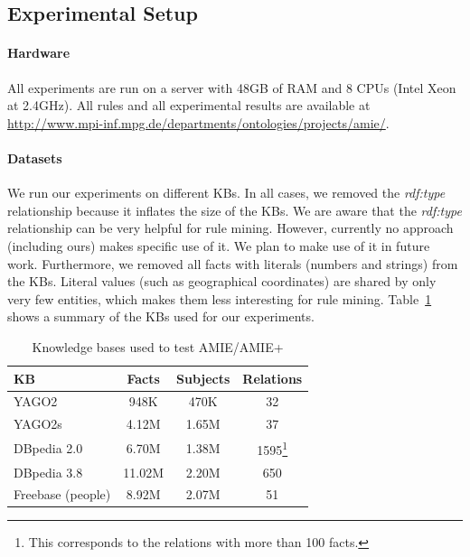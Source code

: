 

\subsection{Experimental Setup}

\paragraph{Hardware}
All experiments are run on a server with 48GB of RAM and 8 CPUs (Intel Xeon at 2.4GHz). All rules and all experimental results are available at \url{http://www.mpi-inf.mpg.de/departments/ontologies/projects/amie/}.

\paragraph{Datasets} We run our experiments on different KBs.
In all cases, we removed the \emph{rdf:type} relationship because it inflates the size of the KBs.
We are aware that the \emph{rdf:type} relationship can be very helpful for rule mining.
However, currently no approach (including ours) makes specific use of it.
We plan to make use of it in future work. Furthermore, we removed all facts with literals (numbers and strings) from the KBs.
Literal values (such as geographical coordinates) are shared by only very few entities, which makes them less interesting for rule mining.
Table~\ref{kbs} shows a summary of the KBs used for our experiments.

\begin{table}
\footnotesize
\begin{tabular}{l|c|c|c}
KB & Facts & Subjects & Relations\\
\hline
YAGO2  & 948K & 470K & 32\\
YAGO2s & 4.12M  & 1.65M & 37\\
DBpedia 2.0 & 6.70M & 1.38M & 1595\footnote{This corresponds to the relations with more than 100 facts.} \\
DBpedia 3.8 & 11.02M & 2.20M & 650 \\
Freebase (people) & 8.92M & 2.07M & 51
\end{tabular}
\caption{Knowledge bases used to test AMIE/AMIE+}
\label{kbs}
\end{table}

